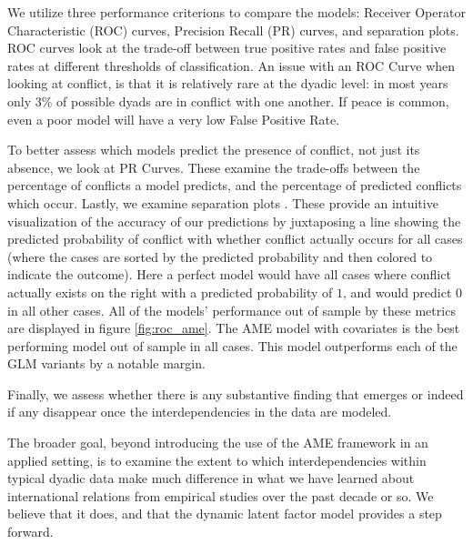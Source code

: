 \documentclass[12pt]{amsart}
\begin{document}
We utilize three performance criterions to compare the models: Receiver Operator Characteristic (ROC) curves, Precision Recall (PR) curves, and separation plots. ROC curves look at the trade-off between true positive rates and false positive rates at different thresholds of classification. An issue with an ROC Curve when looking at conflict, is that it is relatively rare at the dyadic level: in most years only 3\% of possible dyads are in conflict with one another. If peace is common, even a poor model will have a very low False Positive Rate. 

To better assess which models predict the presence of conflict, not just its absence, we look at PR Curves. These examine the trade-offs between the percentage of conflicts a model predicts, and the percentage of predicted conflicts which occur. Lastly, we examine separation plots \citep{greenhill:etal:2011}. These provide an intuitive visualization of the accuracy of our predictions by juxtaposing a line showing the predicted probability of conflict with whether conflict actually occurs for all cases (where the cases are sorted by the predicted probability and then colored to indicate the outcome). Here a perfect model would have all cases where conflict actually exists on the right with a predicted probability of $1$, and would predict $0$ in all other cases. All of the models' performance out of sample by these metrics are displayed in figure \ref{fig:roc_ame}. The AME model with covariates is the best performing model out of sample in all cases. This model outperforms each of the GLM variants by a notable margin.

Finally, we assess whether there is any substantive finding that emerges or indeed if any disappear once the interdependencies in the data are modeled.%

The broader goal, beyond introducing the use of the AME framework in an applied setting, is to examine the extent to which interdependencies within typical dyadic data make much difference in what we have learned about international relations from empirical studies over the past decade or so.  We believe that it does, and that the dynamic latent factor model provides a step forward.
\end{document}
